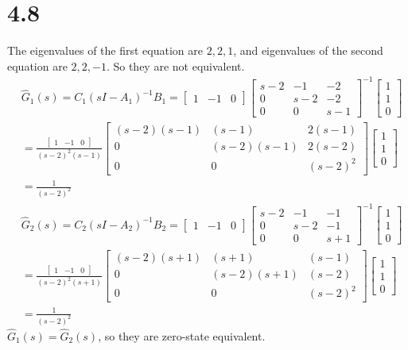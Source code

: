 \documentclass{article}
\begin{document}
\section*{4.8}
The eigenvalues of the first equation are $2,2,1$, and eigenvalues of the second equation are $2,2,-1$. So they are not equivalent.
$$
\begin{aligned}
&\hat{G}_{1}(s)=C_{1}(s I-A_{1})^{-1} B_{1}=\left[\begin{array}{lll}
1 & -1 & 0
\end{array}\right]\left[\begin{array}{ccc}
s-2 & -1 & -2 \\
0 & s-2 & -2 \\
0 & 0 & s-1
\end{array}\right]^{-1}\left[\begin{array}{l}
1 \\
1 \\
0
\end{array}\right]\\
&=\frac{\left[\begin{array}{ccc}
1 & -1 & 0
\end{array}\right]}{(s-2)^{2}(s-1)}\left[\begin{array}{ccc}
(s-2)(s-1) & (s-1) & 2(s-1) \\
0 & (s-2)(s-1) & 2(s-2) \\
0 & 0 & (s-2)^{2}
\end{array}\right]\left[\begin{array}{l}
1 \\
1 \\
0
\end{array}\right]\\
&=\frac{1}{(s-2)^{2}}\\
&\hat{G}_{2}(s)=C_{2}(s I-A_{2})^{-1} B_{2}=\left[\begin{array}{lll}
1 & -1 & 0
\end{array}\right]\left[\begin{array}{ccc}
s-2 & -1 & -1 \\
0 & s-2 & -1 \\
0 & 0 & s+1
\end{array}\right]^{-1}\left[\begin{array}{l}
1 \\
1 \\
0
\end{array}\right]\\
&=\frac{\left[\begin{array}{ccc}
1 & -1 & 0
\end{array}\right]}{(s-2)^{2}(s+1)}\left[\begin{array}{ccc}
(s-2)(s+1) & (s+1) & (s-1) \\
0 & (s-2)(s+1) & (s-2) \\
0 & 0 & (s-2)^{2}
\end{array}\right]\left[\begin{array}{l}
1 \\
1 \\
0
\end{array}\right]\\
&=\frac{1}{(s-2)^{2}}
\end{aligned}
$$
$\hat{G}_{1}(s)=\hat{G}_{2}(s)$, so they are zero-state equivalent.
\end{document}
